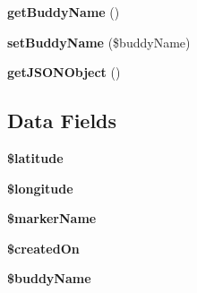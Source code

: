 \begin{DoxyCompactItemize}
\item 
\hypertarget{class_buddy_point_a351b48a110aa3ea088ccd19c6f8da349}{{\bfseries get\+Buddy\+Name} ()}\label{class_buddy_point_a351b48a110aa3ea088ccd19c6f8da349}

\item 
\hypertarget{class_buddy_point_a7eac44b2002c46627383661b5d675de9}{{\bfseries set\+Buddy\+Name} (\$buddy\+Name)}\label{class_buddy_point_a7eac44b2002c46627383661b5d675de9}

\item 
\hypertarget{class_buddy_point_a9f94aa39d469f7968687eff905f71fbb}{{\bfseries get\+J\+S\+O\+N\+Object} ()}\label{class_buddy_point_a9f94aa39d469f7968687eff905f71fbb}

\end{DoxyCompactItemize}
\subsection*{Data Fields}
\begin{DoxyCompactItemize}
\item 
\hypertarget{class_buddy_point_a5635a7326fb0b96e184ca6f5baa13e94}{{\bfseries \$latitude}}\label{class_buddy_point_a5635a7326fb0b96e184ca6f5baa13e94}

\item 
\hypertarget{class_buddy_point_aabb5b5c018fed3789fce382e336cfa47}{{\bfseries \$longitude}}\label{class_buddy_point_aabb5b5c018fed3789fce382e336cfa47}

\item 
\hypertarget{class_buddy_point_ac9278602ad1154da2f5c31d1e1ba3af1}{{\bfseries \$marker\+Name}}\label{class_buddy_point_ac9278602ad1154da2f5c31d1e1ba3af1}

\item 
\hypertarget{class_buddy_point_a980da9bfdce6ade7abd3568e89f80013}{{\bfseries \$created\+On}}\label{class_buddy_point_a980da9bfdce6ade7abd3568e89f80013}

\item 
\hypertarget{class_buddy_point_a2f4874c0d29c7d6df165315a9cacc9e8}{{\bfseries \$buddy\+Name}}\label{class_buddy_point_a2f4874c0d29c7d6df165315a9cacc9e8}

\end{DoxyCompactItemize}

